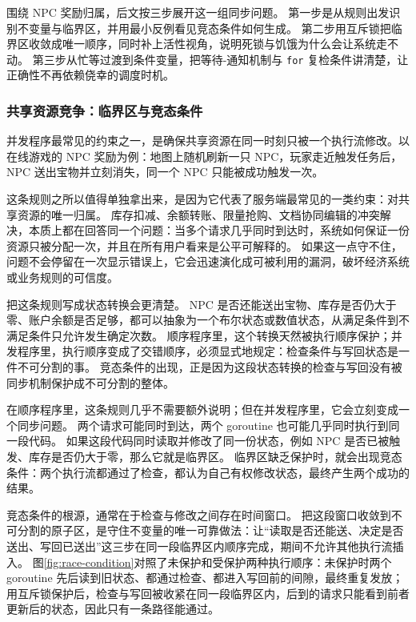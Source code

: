 围绕 NPC 奖励归属，后文按三步展开这一组同步问题。
第一步是从规则出发识别不变量与临界区，并用最小反例看见竞态条件如何生成。
第二步用互斥锁把临界区收敛成唯一顺序，同时补上活性视角，说明死锁与饥饿为什么会让系统走不动。
第三步从忙等过渡到条件变量，把等待-通知机制与 \texttt{for} 复检条件讲清楚，让正确性不再依赖侥幸的调度时机。

\subsubsection{共享资源竞争：临界区与竞态条件}\label{sec3:critical-section-race}

并发程序最常见的约束之一，是确保共享资源在同一时刻只被一个执行流修改。以在线游戏的 NPC 奖励为例：地图上随机刷新一只 NPC，玩家走近触发任务后，NPC 送出宝物并立刻消失，同一个 NPC 只能被成功触发一次。

这条规则之所以值得单独拿出来，是因为它代表了服务端最常见的一类约束：对共享资源的唯一归属。
库存扣减、余额转账、限量抢购、文档协同编辑的冲突解决，本质上都在回答同一个问题：当多个请求几乎同时到达时，系统如何保证一份资源只被分配一次，并且在所有用户看来是公平可解释的。
如果这一点守不住，问题不会停留在一次显示错误上，它会迅速演化成可被利用的漏洞，破坏经济系统或业务规则的可信度。

把这条规则写成状态转换会更清楚。
NPC 是否还能送出宝物、库存是否仍大于零、账户余额是否足够，都可以抽象为一个布尔状态或数值状态，从满足条件到不满足条件只允许发生确定次数。
顺序程序里，这个转换天然被执行顺序保护；并发程序里，执行顺序变成了交错顺序，必须显式地规定：检查条件与写回状态是一件不可分割的事。
竞态条件的出现，正是因为这段状态转换的检查与写回没有被同步机制保护成不可分割的整体。

在顺序程序里，这条规则几乎不需要额外说明；但在并发程序里，它会立刻变成一个同步问题。
两个请求可能同时到达，两个 goroutine 也可能几乎同时执行到同一段代码。
如果这段代码同时读取并修改了同一份状态，例如 NPC 是否已被触发、库存是否仍大于零，那么它就是临界区。
临界区缺乏保护时，就会出现竞态条件：两个执行流都通过了检查，都认为自己有权修改状态，最终产生两个成功的结果。

竞态条件的根源，通常在于检查与修改之间存在时间窗口。
把这段窗口收敛到不可分割的原子区，是守住不变量的唯一可靠做法：让“读取是否还能送、决定是否送出、写回已送出”这三步在同一段临界区内顺序完成，期间不允许其他执行流插入。
图\ref{fig:race-condition}对照了未保护和受保护两种执行顺序：未保护时两个 goroutine 先后读到旧状态、都通过检查、都进入写回前的间隙，最终重复发放；用互斥锁保护后，检查与写回被收紧在同一段临界区内，后到的请求只能看到前者更新后的状态，因此只有一条路径能通过。


